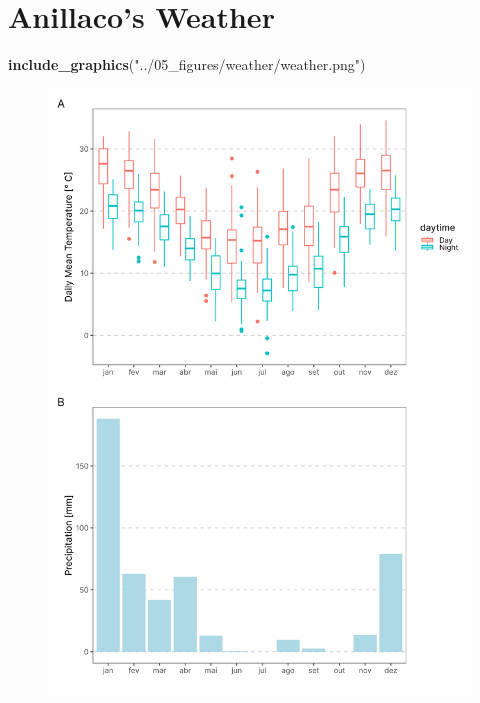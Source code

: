 \documentclass[msc,numbers,hidelinks]{coppe}
\newenvironment{Shaded}{\begin{snugshade}}{\end{snugshade}}
\newcommand{\KeywordTok}[1]{\textcolor[rgb]{0.13,0.29,0.53}{\textbf{#1}}}
\newcommand{\NormalTok}[1]{#1}
\newcommand{\StringTok}[1]{\textcolor[rgb]{0.31,0.60,0.02}{#1}}
\begin{document}
  \hypertarget{anillacos-weather}{%
  \chapter{Anillaco's Weather}\label{anillacos-weather}}
\begin{Shaded}
\begin{Highlighting}[]
\KeywordTok{include\_graphics}\NormalTok{(}\StringTok{"../05\_figures/weather/weather.png"}\NormalTok{)}
\end{Highlighting}
\end{Shaded}
  \begin{figure}
  \includegraphics[width=1\linewidth]{../05_figures/weather/weather} \end{figure}

  \backmatter
  
  
\end{document}
